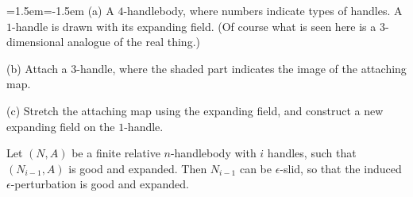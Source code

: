 {\begin{center}
    \medskip

    \parbox{96mm}{\small\leftskip=1.5em\parindent=-1.5em
        (a) A $4$-handlebody, where numbers indicate types of handles.
        A $1$-handle is drawn with its expanding field.
        (Of course what is seen here is a $3$-dimensional analogue of the real thing.)
        
        (b) Attach a $3$-handle,
        where the shaded part indicates the image of the attaching map.
        
        (c) Stretch the attaching map using the expanding field,
        and construct a new expanding field on the $1$-handle.
    }
\end{center}}

\begin{lemma}\label{lem:expanded}
    Let $(N,A)$ be a finite relative $n$-handlebody with $i$ handles,
    such that $(N_{i-1},A)$ is good and expanded.
    Then $N_{i-1}$ can be $\epsilon$-slid,
    so that the induced $\epsilon$-perturbation is good and expanded.
\end{lemma}
    

